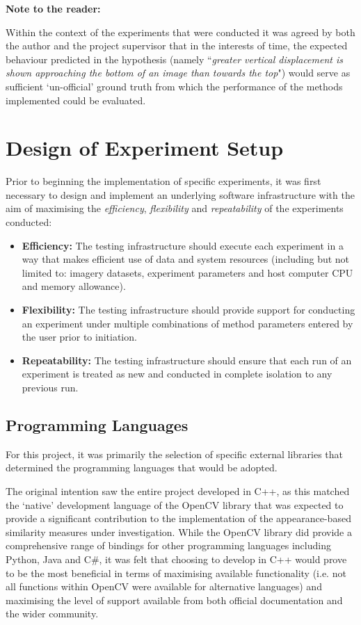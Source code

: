 \textbf{Note to the reader:}

Within the context of the experiments that were conducted it was agreed by both the author and the project supervisor that in the interests of time, the expected behaviour predicted in the hypothesis (namely  ``\textit{greater vertical displacement is shown approaching the bottom of an image than towards the top}") would serve as sufficient `un-official' ground truth from which the performance of the methods implemented could be evaluated.

\section{Design of Experiment Setup}

Prior to beginning the implementation of specific experiments, it was first necessary to design and implement an underlying software infrastructure with the aim of maximising the \textit{efficiency}, \textit{flexibility} and \textit{repeatability} of the experiments conducted:

\begin{itemize}
	\item \textbf{Efficiency:} The testing infrastructure should execute each experiment in a way that makes efficient use of data and system resources (including but not limited to: imagery datasets, experiment parameters and host computer CPU and memory allowance).
	\item \textbf{Flexibility:} The testing infrastructure should provide support for conducting an experiment under multiple combinations of method parameters entered by the user prior to initiation.  
	\item \textbf{Repeatability:} The testing infrastructure should ensure that each run of an experiment is treated as new and conducted in complete isolation to any previous run. 
\end{itemize}

\subsection{Programming Languages}
\label{lang}

For this project, it was primarily the selection of specific external libraries that determined the programming languages that would be adopted.

The original intention saw the entire project developed in C++, as this matched the `native' development language of the OpenCV library \cite{opencv} that was expected to provide a significant contribution to the implementation of the appearance-based similarity measures under investigation. While the OpenCV library did provide a comprehensive range of bindings for other programming languages including Python, Java and C\#, it was felt that choosing to develop in C++ would prove to be the most beneficial in terms of maximising available functionality (i.e. not all functions within OpenCV were available for alternative languages) and maximising the level of support available from both official documentation and the wider community. 

